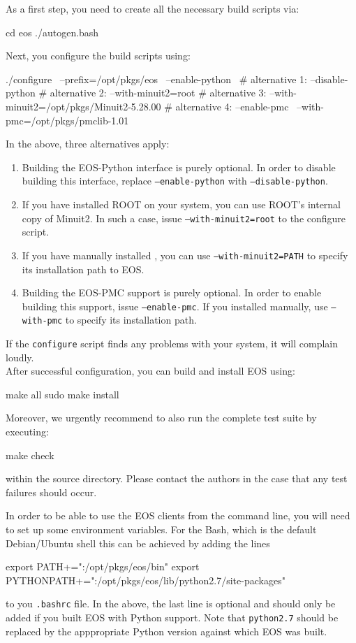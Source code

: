As a first step, you need to create all the necessary build scripts via:
%
\begin{commandline}
cd eos
./autogen.bash
\end{commandline}
%
Next, you configure the build scripts using:
%
\begin{commandline}
./configure \
    --prefix=/opt/pkgs/eos \
    --enable-python \
    # alternative 1: --disable-python
    # alternative 2: --with-minuit2=root
    # alternative 3: --with-minuit2=/opt/pkgs/Minuit2-5.28.00
    # alternative 4: --enable-pmc \
                     --with-pmc=/opt/pkgs/pmclib-1.01
\end{commandline}
%
In the above, three alternatives apply:
\begin{enumerate}
    \item Building the EOS-Python interface is purely optional. In order to disable building
    this interface, replace \texttt{--enable-python} with \texttt{--disable-python}.
    \item If you have installed ROOT on your system, you can use ROOT's internal copy of Minuit2.
    In such a case, issue \texttt{--with-minuit2=root} to the configure script.
    \item If you have manually installed \package{minuit2}, you can use \texttt{--with-minuit2=PATH}
    to specify its installation path to EOS.
    \item Building the EOS-PMC support is purely optional. In order to enable building this
    support, issue \texttt{--enable-pmc}. If you installed \package{libpmc} manually, use
    \texttt{--with-pmc} to specify its installation path.
\end{enumerate}
If the \texttt{configure} script finds any problems with your system, it will complain loudly.\\

After successful configuration, you can build and install EOS using:
%
\begin{commandline}
make all
sudo make install
\end{commandline}
%
Moreover, we urgently recommend to also run the complete test suite by executing:
%
\begin{commandline}
make check
\end{commandline}
%
within the source directory. Please contact the authors in the case that any
test failures should occur.


In order to be able to use the EOS clients from the command line, you will need to
set up some environment variables. For the Bash, which is the default Debian/Ubuntu
shell this can be achieved by adding the lines
\begin{commandline}
export PATH+=":/opt/pkgs/eos/bin"
export PYTHONPATH+=":/opt/pkgs/eos/lib/python2.7/site-packages"
\end{commandline}
to you \texttt{.bashrc} file. In the above, the last line is optional and should only be
added if you built EOS with Python support. Note that \texttt{python2.7} should be
replaced by the apppropriate Python version against which EOS was built.


